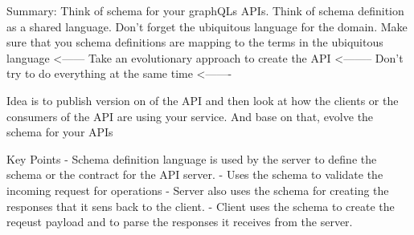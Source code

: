 Summary:
Think of schema for your graphQLs APIs.
Think of schema definition as a shared language.
Don't forget the ubiquitous language for the domain.
Make sure that you schema definitions are mapping to the terms in the ubiquitous language <------
Take an evolutionary approach to create the API <--------
Don't try to do everything at the same time <-------

Idea is to publish version on of the API and then look at how the clients or the consumers of the API are using your service.
And base on that, evolve the schema for your APIs

Key Points
- Schema definition language is used by the server to define the schema or the contract for the API server.
- Uses the schema to validate the incoming request for operations
- Server also uses the schema for creating the responses that it sens back to the client.
- Client uses the schema to create the reqeust payload and to parse the responses it receives from the server.

